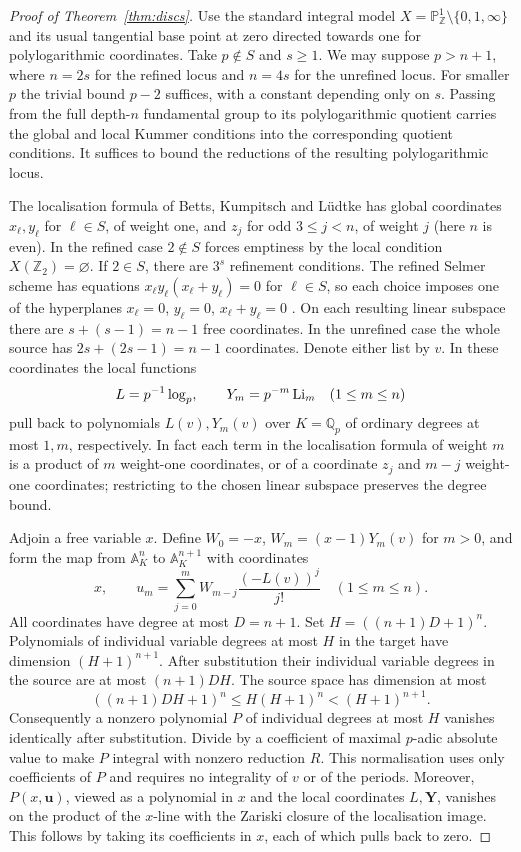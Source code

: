 \begin{proof}[Proof of Theorem~\ref{thm:discs}]
Use the standard integral model
$X=\mathbb P^1_{\mathbb Z}\setminus\{0,1,\infty\}$ and its usual
tangential base point at zero directed towards one for polylogarithmic
coordinates. Take $p\notin S$ and $s\ge1$. We may suppose $p>n+1$,
where $n=2s$ for the refined locus and $n=4s$ for the unrefined locus.
For smaller $p$ the trivial bound $p-2$ suffices, with a constant
depending only on $s$. Passing from the full depth-$n$ fundamental
group to its polylogarithmic quotient carries the global and local Kummer
conditions into the corresponding quotient conditions. It suffices to bound
the reductions of the resulting polylogarithmic locus.

The localisation formula of Betts, Kumpitsch and L\"udtke
\cite[Propositions~5.3 and~5.9, Theorem~5.6]{BKL}
has global coordinates $x_\ell,y_\ell$ for $\ell\in S$, of weight one,
and $z_j$ for odd $3\le j<n$, of weight $j$ (here $n$ is even).
In the refined case $2\notin S$ forces emptiness by the local
condition $X(\mathbb Z_2)=\varnothing$. If $2\in S$, there are $3^s$
refinement conditions. The refined Selmer scheme has equations
$x_\ell y_\ell(x_\ell+y_\ell)=0$ for $\ell\in S$, so each choice
imposes one of the hyperplanes
$x_\ell=0$, $y_\ell=0$, $x_\ell+y_\ell=0$
\cite[Proposition~5.11]{BKL}. On each resulting linear subspace there
are $s+(s-1)=n-1$ free coordinates. In the unrefined case the whole
source has $2s+(2s-1)=n-1$ coordinates. Denote either list by $v$.
In these coordinates the local functions
\[
 L=p^{-1}\log_p,\qquad Y_m=p^{-m}\operatorname{Li}_m\quad(1\le m\le n)
\]
pull back to polynomials $L(v),Y_m(v)$ over $K=\mathbb Q_p$ of ordinary
degrees at most $1,m$, respectively. In fact each term in the
localisation formula \cite[(5.4)--(5.5)]{BKL} of weight $m$ is a product of $m$ weight-one
coordinates, or of a coordinate $z_j$ and $m-j$ weight-one coordinates;
restricting to the chosen linear subspace preserves the degree bound.

Adjoin a free variable $x$. Define $W_0=-x$, $W_m=(x-1)Y_m(v)$ for $m>0$,
and form the map from $\mathbb A_K^n$ to $\mathbb A_K^{n+1}$ with coordinates
\[
 x,\qquad u_m=\sum_{j=0}^{m}W_{m-j}\frac{(-L(v))^j}{j!}
           \quad (1\le m\le n).
\]
All coordinates have degree at most $D=n+1$. Set $H=((n+1)D+1)^n$.
Polynomials of individual variable degrees at most $H$ in the target
have dimension $(H+1)^{n+1}$. After substitution their individual
variable degrees in the source are at most $(n+1)DH$. The source
space has dimension at most
\[
 ((n+1)DH+1)^n\le H(H+1)^n<(H+1)^{n+1}.
\]
Consequently a nonzero polynomial $P$ of individual degrees at most $H$
vanishes identically after substitution. Divide by a coefficient of
maximal $p$-adic absolute value to make $P$ integral with nonzero
reduction $R$. This normalisation uses only coefficients of $P$ and
requires no integrality of $v$ or of the periods. Moreover,
$P(x,\boldsymbol u)$, viewed as a polynomial in $x$ and the local
coordinates $L,\boldsymbol Y$, vanishes on the product of the $x$-line
with the Zariski closure of the localisation image. This follows by
taking its coefficients in $x$, each of which pulls back to zero.


\end{proof}
